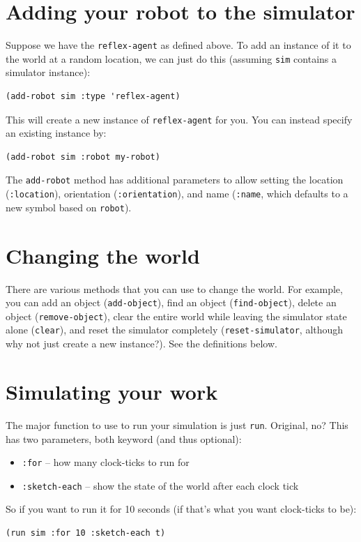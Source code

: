 \documentclass[11pt]{tufte-handout}
\begin{document}
\section{Adding your robot to the simulator}
\label{sec:org61cde99}

Suppose we have the \texttt{reflex-agent} as defined above.  To add an instance of it to the world at a random location, we can just do this (assuming \texttt{sim} contains a simulator instance):
\begin{verbatim}
(add-robot sim :type 'reflex-agent)
\end{verbatim}

\noindent This will create a new instance of \texttt{reflex-agent} for you.  You can instead specify an existing instance by:
\begin{verbatim}
(add-robot sim :robot my-robot)
\end{verbatim}


The \texttt{add-robot} method has additional parameters to allow setting the location (\texttt{:location}), orientation (\texttt{:orientation}), and name (\texttt{:name}, which defaults to a new symbol based on \texttt{robot}).

\section{Changing the world}
\label{sec:orgbff2443}

There are various methods that you can use to change the world.  For example, you can add an object (\texttt{add-object}), find an object (\texttt{find-object}), delete an object (\texttt{remove-object}), clear the entire world while leaving the simulator state alone (\texttt{clear}), and reset the simulator completely (\texttt{reset-simulator}, although why not just create a new instance?).  See the definitions below.

\section{Simulating your work}
\label{sec:org865ee33}

The major function to use to run your simulation is just \texttt{run}.  Original, no?  This has two parameters, both keyword (and thus optional):
\begin{itemize}
\item \texttt{:for} -- how many clock-ticks to run for
\item \texttt{:sketch-each} -- show the state of the world after each clock tick
\end{itemize}
So if you want to run it for 10 seconds (if that's what you want  clock-ticks to be):
\begin{verbatim}
(run sim :for 10 :sketch-each t)
\end{verbatim}
\end{document}
